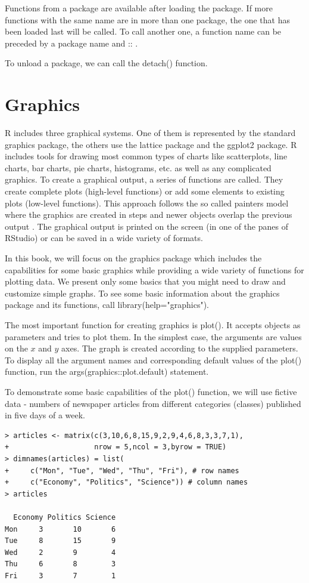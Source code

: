 \documentclass[11pt,openany,executivepaper]{book}
\begin{document}
Functions from a package are available after loading the package. If more functions with the same name are in more than one package, the one that has been loaded last will be called. To call another one, a function name can be preceded by a package name and :: .

To unload a package, we can call the detach() function.

\section{Graphics}
R includes three graphical systems. One of them is represented by the standard graphics package, the others use the lattice package and the ggplot2 package. R includes tools for drawing most common types of charts like scatterplots, line charts, bar charts, pie charts, histograms, etc. as well as any complicated graphics. To create a graphical output, a series of functions are called. They create complete plots (high-level functions) or add some elements to existing plots (low-level functions). This approach follows the so called painters model where the graphics are created in steps and newer objects overlap the previous output \cite{204}. The graphical output is printed on the screen (in one of the panes of RStudio) or can be saved in a wide variety of formats.

In this book, we will focus on the graphics package which includes the capabilities for some basic graphics while providing a wide variety of functions for plotting data. We present only some basics that you might need to draw and customize simple graphs. To see some basic information about the graphics package and its functions, call library(help="graphics").

The most important function for creating graphics is plot(). It accepts objects as parameters and tries to plot them. In the simplest case, the arguments are values on the $x$ and $y$ axes. The graph is created according to the supplied parameters. To display all the argument names and corresponding default values of the plot() function, run the args(graphics::plot.default) statement.

To demonstrate some basic capabilities of the plot() function, we will use fictive data - numbers of newspaper articles from different categories (classes) published in five days of a week.

\begin{verbatim}
> articles <- matrix(c(3,10,6,8,15,9,2,9,4,6,8,3,3,7,1),
+                    nrow = 5,ncol = 3,byrow = TRUE)
> dimnames(articles) = list(
+     c("Mon", "Tue", "Wed", "Thu", "Fri"), # row names
+     c("Economy", "Politics", "Science")) # column names
> articles

  Economy Politics Science
Mon     3       10       6
Tue     8       15       9
Wed     2       9        4
Thu     6       8        3
Fri     3       7        1

\end{verbatim}
\end{document}
